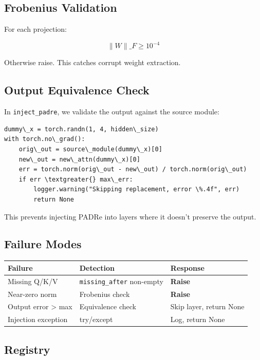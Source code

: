 \subsection{Frobenius Validation}

For each projection:

\[
\|W\|\_F \geq 10^{-4}
\tag{5.1}
\]

Otherwise raise. This catches corrupt weight extraction.

\subsection{Output Equivalence Check}

In \texttt{inject\_padre}, we validate the output against the source module:

\begin{lstlisting}
dummy\_x = torch.randn(1, 4, hidden\_size)
with torch.no\_grad():
    orig\_out = source\_module(dummy\_x)[0]
    new\_out = new\_attn(dummy\_x)[0]
    err = torch.norm(orig\_out - new\_out) / torch.norm(orig\_out)
    if err \textgreater{} max\_err:
        logger.warning("Skipping replacement, error \%.4f", err)
        return None
\end{lstlisting}

This prevents injecting PADRe into layers where it doesn't preserve the 
output.

\subsection{Failure Modes}

\begin{table}[H]
\centering
\small
\begin{tabular}{lll}
\toprule
\textbf{Failure} & \textbf{Detection} & \textbf{Response} \\
\midrule
Missing Q/K/V & \texttt{missing\_after} non-empty & \textbf{Raise} \\
Near-zero norm & Frobenius check & \textbf{Raise} \\
Output error \textgreater{} max & Equivalence check & Skip layer, return None \\
Injection exception & try/except & Log, return None \\
\bottomrule
\end{tabular}
\end{table}

\subsection{Registry}

